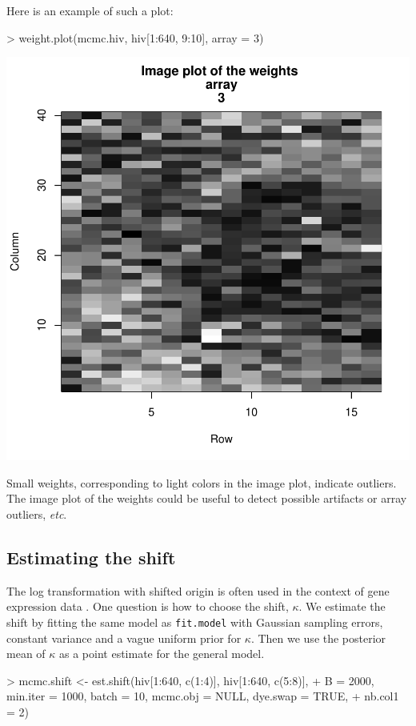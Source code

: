 \documentclass[11pt]{article}
\begin{document}
Here is an example of such a plot:
\begin{center} 
\begin{Schunk}
\begin{Sinput}
> weight.plot(mcmc.hiv, hiv[1:640, 9:10], array = 3)
\end{Sinput}
\end{Schunk}
\includegraphics{rama-imagew}
\end{center}
Small weights, corresponding to light colors in the image plot, indicate  outliers. The image plot of the weights could be useful to detect 
possible artifacts or array outliers, \textit{etc}.   


\subsection{Estimating the shift}
The log transformation with shifted origin is often used in the context of gene expression data \cite{bib:kerr00,bib:cui02}.
One question is how to choose the shift, $\kappa$. 
We estimate the shift by fitting the same model as {\tt fit.model} with Gaussian sampling errors, constant variance and 
a vague uniform prior for $\kappa$. Then we use the posterior mean of $\kappa$ as a point estimate for the general model.


\begin{Schunk}
\begin{Sinput}
> mcmc.shift <- est.shift(hiv[1:640, c(1:4)], hiv[1:640, c(5:8)], 
+     B = 2000, min.iter = 1000, batch = 10, mcmc.obj = NULL, dye.swap = TRUE, 
+     nb.col1 = 2)
\end{Sinput}
\end{Schunk}
\end{document}
